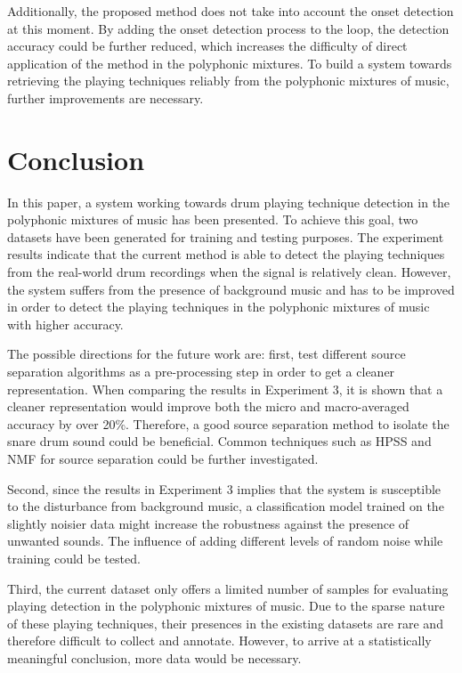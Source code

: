 \documentclass{article}
\begin{document}
{{{{{{{{{%
Additionally, the proposed method does not take into account the onset detection at this moment. By adding the onset detection process to the loop, the detection accuracy could be further reduced, which increases the difficulty of direct application of the method in the polyphonic mixtures. To build a system towards retrieving the playing techniques reliably from the polyphonic mixtures of music, further improvements are necessary.  

\section{Conclusion}
\label{sec:conclusion}
In this paper, a system working towards drum playing technique detection in the polyphonic mixtures of music has been presented. To achieve this goal, two datasets have been generated for training and testing purposes. The experiment results indicate that the current method is able to detect the playing techniques from the real-world drum recordings when the signal is relatively clean. However, the system suffers from the presence of background music and has to be improved in order to detect the playing techniques in the polyphonic mixtures of music with higher accuracy. 

The possible directions for the future work are: first, test different source separation algorithms as a pre-processing step in order to get a cleaner representation. When comparing the results in Experiment 3, it is shown that a cleaner representation would improve both the micro and macro-averaged accuracy by over 20\%. Therefore, a good source separation method to isolate the snare drum sound could be beneficial. Common techniques such as HPSS and NMF for source separation could be further investigated.

Second, since the results in Experiment 3 implies that the system is susceptible to the disturbance from background music, a classification model trained on the slightly noisier data might increase the robustness against the presence of unwanted sounds. The influence of adding different levels of random noise while training could be tested.

Third, the current dataset only offers a limited number of samples for evaluating playing detection in the polyphonic mixtures of music. Due to the sparse nature of these playing techniques, their presences in the existing datasets  are rare and therefore difficult to collect and annotate. However, to arrive at a statistically meaningful conclusion, more data would be necessary.

}}}}}}}}}
\end{document}
